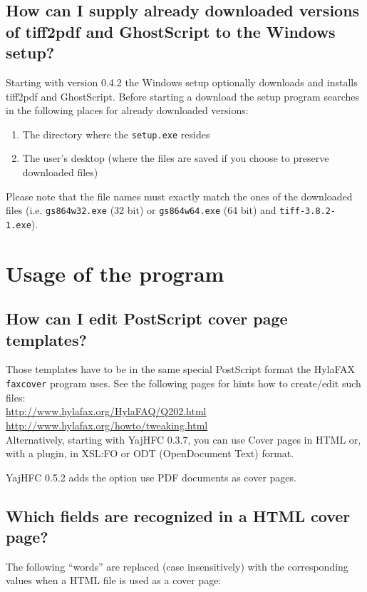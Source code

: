 \documentclass[a4paper,10pt]{scrartcl}
\begin{document}
\subsection{How can I supply already downloaded versions of tiff2pdf and GhostScript to the Windows setup?}

Starting with version 0.4.2 the Windows setup optionally downloads and installs tiff2pdf and GhostScript.
Before starting a download the setup program searches in the following places for already downloaded versions:
\begin{enumerate}
 \item The directory where the \texttt{setup.exe} resides
 \item The user's desktop (where the files are saved if you choose to preserve downloaded files)
\end{enumerate}

Please note that the file names must exactly match the ones of the downloaded files (i.e. \texttt{gs864w32.exe} (32 bit) or \texttt{gs864w64.exe} (64 bit) and \texttt{tiff-3.8.2-1.exe}).

\section{Usage of the program}	

\subsection{How can I edit PostScript cover page templates?}
Those templates have to be in the same special PostScript format the HylaFAX
\texttt{faxcover} program uses. See the following pages for hints how to create/edit
such files: \\
\url{http://www.hylafax.org/HylaFAQ/Q202.html}\\
\url{http://www.hylafax.org/howto/tweaking.html}\\

Alternatively, starting with YajHFC 0.3.7, you can use Cover pages in HTML or, with a plugin, in XSL:FO or ODT (OpenDocument Text) format.

YajHFC 0.5.2 adds the option use PDF documents as cover pages.

\subsection{Which fields are recognized in a HTML cover page?}

The following ``words'' are replaced (case insensitively) with the corresponding values when a HTML file is used as a cover page:
\end{document}
